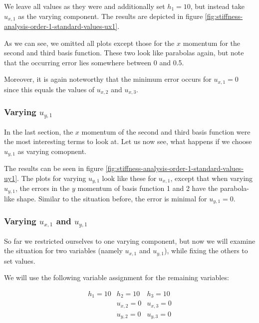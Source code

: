 \documentclass{article}
\begin{document}
We leave all values as they were and additionally set $h_1=10$, but instead take $u_{x,1}$ as the varying component. The results are depicted in figure \ref{fig:stiffness-analysis-order-1-standard-values-ux1}.



As we can see, we omitted all plots except those for the $x$ momentum for the second and third basis function. These two look like parabolas again, but note that the occurring error lies somewhere between 0 and 0.5.

Moreover, it is again noteworthy that the minimum error occurs for $u_{x,1}=0$ since this equals the values of $u_{x,2}$ and $u_{x,3}$.

\subsubsection{\texorpdfstring{Varying $u_{y,1}$}{Varying uy1}}

In the last section, the $x$ momentum of the second and third basis function were the most interesting terms to look at. Let us now see, what happens if we choose $u_{y,1}$ as varying comopnent.



The results can be seen in figure \ref{fig:stiffness-analysis-order-1-standard-values-uy1}. The plots for varying $u_{y,1}$ look like these for $u_{x,1}$, except that when varying $u_{y,1}$, the errors in the $y$ momentum of basis function 1 and 2 have the parabola-like shape. Similar to the situation before, the error is minimal for $u_{y,1}=0$.

\subsubsection{\texorpdfstring{Varying $u_{x,1}$ and $u_{y,1}$}{Varying ux1 and uy1}}

So far we restricted ourselves to one varying component, but now we will examine the situation for two variables (namely $u_{x,1}$ and $u_{y,1}$), while fixing the others to set values.

We will use the following variable assignment for the remaining variables:

\begin{eqnarray*}
  h_1 = 10 & h_2 = 10 & h_3 = 10 \\
   & u_{x,2} = 0 & u_{x,3} = 0 \\
   & u_{y,2} = 0 & u_{y,3} = 0
\end{eqnarray*}
\end{document}
